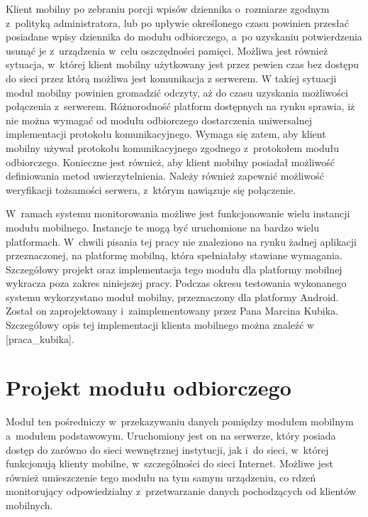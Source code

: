 Klient mobilny po zebraniu porcji wpisów dziennika o~rozmiarze zgodnym
z~polityką administratora, lub po upływie określonego czasu powinien
przesłać posiadane wpisy dziennika do modułu odbiorczego, a~po
uzyskaniu potwierdzenia usunąć je z~urządzenia w~celu oszczędności
pamięci. Możliwa jest również sytuacja, w~której klient mobilny
użytkowany jest przez pewien czas bez dostępu do sieci przez którą
możliwa jest komunikacja z serwerem. W takiej sytuacji moduł mobilny
powinien gromadzić odczyty, aż do czasu uzyskania możliwości
połączenia z~serwerem. Różnorodność platform dostępnych na rynku
sprawia, iż nie można wymagać od modułu odbiorczego dostarczenia
uniwersalnej implementacji protokołu komunikacyjnego. Wymaga się
zatem, aby klient mobilny używał protokołu komunikacyjnego zgodnego
z~protokołem modułu odbiorczego. Konieczne jest również, aby klient
mobilny posiadał możliwość definiowania metod uwierzytelnienia. Należy
również zapewnić możliwość weryfikacji tożsamości serwera, z~którym
nawiązuje się połączenie.

W~ramach systemu monitorowania możliwe jest funkcjonowanie wielu
instancji modułu mobilnego. Instancje te mogą być uruchomione na
bardzo wielu platformach. W~chwili pisania tej pracy nie znaleziono na
rynku żadnej aplikacji przeznaczonej, na platformę mobilną, która
spełniałaby stawiane wymagania. Szczegółowy projekt oraz
implementacja tego modułu dla platformy mobilnej wykracza poza zakres
niniejszej pracy. Podczas okresu testowania wykonanego systemu
wykorzystano moduł mobilny, przeznaczony dla platformy Android. Został
on zaprojektowany i~zaimplementowany przez Pana Marcina
Kubika. Szczegółowy opis tej implementacji klienta mobilnego można
znaleźć w [praca\_kubika].

\section[Projekt modułu odbiorczego][Projekt modułu odbiorczego]{Projekt modułu odbiorczego}
\label{sec:ProjModOdb}

Moduł ten pośredniczy w~przekazywaniu danych pomiędzy modułem mobilnym
a~modułem podstawowym. Uruchomiony jest on na serwerze, który posiada
dostęp do zarówno do sieci wewnętrznej instytucji, jak i~do sieci,
w~której funkcjonują klienty mobilne, w~szczególności do sieci
Internet. Możliwe jest również umieszczenie tego modułu na tym samym
urządzeniu, co rdzeń monitorujący odpowiedzialny z~przetwarzanie
danych pochodzących od klientów mobilnych.

